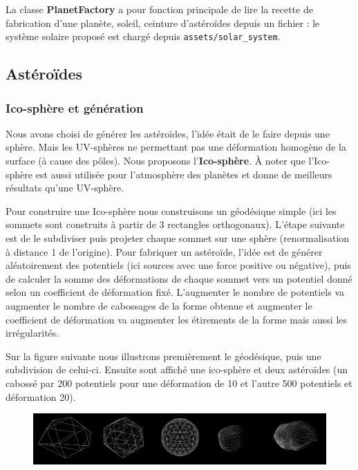 \documentclass[11pt,a4paper]{article}
\begin{document}
La classe \textbf{PlanetFactory} a pour fonction principale de lire la recette de fabrication d'une planète, soleil, ceinture d'astéroïdes depuis un fichier : le système solaire proposé est chargé depuis \verb!assets/solar_system!.

\subsection{Astéroïdes}
\subsubsection{Ico-sphère et génération}

Nous avons choisi de générer les astéroïdes, l'idée était de le faire depuis une sphère. Mais les UV-sphères ne permettant pas une déformation homogène de la surface (à cause des pôles). Nous proposons l'\textbf{Ico-sphère}. À noter que l'Ico-sphère est aussi utilisée pour l'atmosphère des planètes et donne de meilleurs résultats qu'une UV-sphère.

Pour construire une Ico-sphère nous construisons un géodésique simple (ici les sommets sont construits à partir de 3 rectangles orthogonaux). L'étape suivante est de le subdiviser puis projeter chaque sommet sur une sphère (renormalisation à distance 1 de l'origine).
Pour fabriquer un astéroïde, l'idée est de générer aléatoirement des potentiels (ici sources avec une force positive ou négative), puis de calculer la somme des déformations de chaque sommet vers un potentiel donné selon un coefficient de déformation fixé.
L'augmenter le nombre de potentiels va augmenter le nombre de cabossages de la forme obtenue et augmenter le coefficient de déformation va augmenter les étirements de la forme mais aussi les irrégularités.

Sur la figure suivante nous illustrons premièrement le géodésique, puis une subdivision de celui-ci.
Ensuite sont affiché une ico-sphère et deux astéroïdes (un cabossé par 200 potentiels pour une déformation de 10 et l'autre 500 potentiels et déformation 20).

\begin{figure}[h!]
\centering
\includegraphics[width=0.99\columnwidth]{img/ico.png}
\end{figure}
\end{document}
